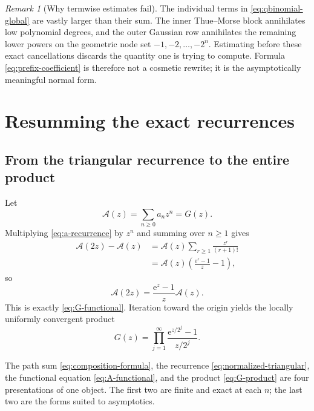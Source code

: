 \documentclass[11pt,oneside]{article}
\theoremstyle{definition}
\theoremstyle{remark}
\newtheorem{remark}[theorem]{Remark}
\newcommand{\e}{\mathrm e}
\begin{document}
\begin{remark}[Why termwise estimates fail]
The individual terms in \eqref{eq:qbinomial-global} are vastly larger than their sum.  The inner Thue--Morse block annihilates low polynomial degrees, and the outer Gaussian row annihilates the remaining lower powers on the geometric node set $-1,-2,\ldots,-2^n$.  Estimating before these exact cancellations discards the quantity one is trying to compute.  Formula \eqref{eq:prefix-coefficient} is therefore not a cosmetic rewrite; it is the asymptotically meaningful normal form.
\end{remark}

\section{Resumming the exact recurrences}
\label{sec:resummation}

\subsection{From the triangular recurrence to the entire product}
\label{subsec:composition-resummation}

Let
\begin{equation}
 \mathscr A(z)=\sum_{n\ge0}a_nz^n=G(z).
\label{eq:A-series}
\end{equation}
Multiplying \eqref{eq:a-recurrence} by $z^n$ and summing over $n\ge1$ gives
\begin{align*}
 \mathscr A(2z)-\mathscr A(z)
 &=\mathscr A(z)\sum_{r\ge1}\frac{z^r}{(r+1)!}\\
 &=\mathscr A(z)\left(\frac{\e^z-1}{z}-1\right),
\end{align*}
so
\begin{equation}
 \mathscr A(2z)=\frac{\e^z-1}{z}\mathscr A(z).
\label{eq:A-functional}
\end{equation}
This is exactly \eqref{eq:G-functional}.  Iteration toward the origin yields the locally uniformly convergent product
\begin{equation}
 \boxed{
 G(z)=\prod_{j=1}^{\infty}
 \frac{\e^{z/2^j}-1}{z/2^j}.}
\label{eq:G-product}
\end{equation}

The path sum \eqref{eq:composition-formula}, the recurrence
\eqref{eq:normalized-triangular}, the functional equation \eqref{eq:A-functional}, and the product \eqref{eq:G-product} are four presentations of one object.  The first two are finite and exact at each $n$; the last two are the forms suited to asymptotics.
\end{document}
